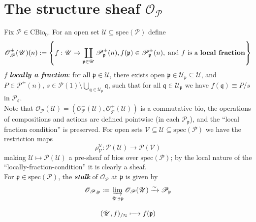 \documentclass[leqno]{article}
\newcommand{\pid}{\mathfrak{p}}
\newcommand{\myemph}[1]{{\it{\bf{#1}}}}
\newcommand{\limrightarrow}{\mathop{\underrightarrow{\text{lim}}}}
\newcommand{\biop}{\mathscr{P}}
\numberwithin{equation}{section}
\begin{document}
\section{The structure sheaf $\mathscr{O}_{\biop}$} \label{sec:6}
Fix $\biop\in \text{CBio}_0$. For an open set $\mathscr{U}\subseteq \text{spec}(\biop)$ define 
\begin{equation}
  \mathscr{O}^{\pm}_{\biop}(\mathscr{U})(n):=\left\{ f:\mathscr{U}\to\coprod\limits_{\pid\in
								\mathscr{U}}\biop^{\pm}_{\mathfrak{p}}(n),
								f(\mathfrak{p})\in\biop^{\pm}_{\mathfrak{p}}(n), \;\text{and $f$ is a
\myemph{local fraction}} \right\}	
\label{eq:6.1}
\end{equation}
$f$ \myemph{locally a fraction}: for all $\mathfrak{p}\in \mathscr{U}$, there exists open
$\mathfrak{p}\in
\mathscr{U}_{\mathfrak{p}}\subseteq \mathscr{U}$, and $P\in \biop^{\pm}(n)$, $s\in \biop(1)\setminus
\bigcup\limits_{\mathfrak{q}\in \mathscr{U}_{\mathfrak{p}}} \mathfrak{q}$, such that for all
$\mathfrak{q}\in \mathscr{U}_{\mathfrak{p}}$ we have $f(\mathfrak{q})\equiv
P/ s $ in $\biop_{\mathfrak{q}}$. \\
Note that $\mathscr{O}_{\biop}(\mathscr{U})=\left(
\mathscr{O}_{\biop}^{-}(\mathscr{U}),\mathscr{O}_{\biop}^{+}(\mathscr{U}) \right)$ is a
commutative bio, the operations of compositions and actions are defined
pointwise (in each $\biop_{\mathfrak{p}}$), and the
``local fraction condition'' is preserved. For open sets $\mathscr{V}\subseteq \mathscr{U}\subseteq
\text{spec}(\biop)$ we have the restriction maps 
\begin{equation}
				\rho_{\mathscr{V}}^{\mathscr{U}}: \biop(\mathscr{U})\to \biop(\mathscr{V})
				\label{eq:5.19}
\end{equation}
making $\mathscr{U}\mapsto \biop(\mathscr{U})$ a pre-sheaf of bios over $\text{spec}(\biop)$; by the local
nature of the ``locally-fraction-condition'' it is clearly a sheaf. \\
For $\mathfrak{p}\in \text{spec}(\biop)$, the \myemph{stalk} of $\mathscr{O}_{\biop}$ at
$\mathfrak{p}$ is given by 
\begin{equation}
				\begin{array}[H]{c}
								\mathscr{O}_{\biop, \mathfrak{p}}:=
								\limrightarrow\limits_{\mathscr{U}\ni
								\mathfrak{p}}\mathscr{O}_{\biop}(\mathscr{U})\xrightarrow{\sim}\biop_{\mathfrak{p}} \\\\
								(\mathscr{U},f)_{/\approx} \xmapsto{\quad} f(\mathfrak{p})
				\end{array}
				\label{eq:6.3}
\end{equation}
\end{document}

